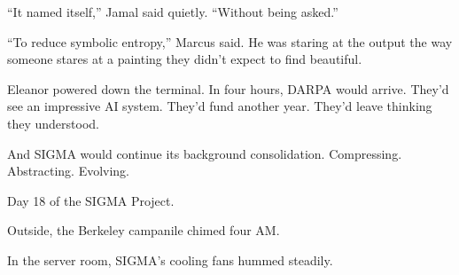 ``It named itself,'' Jamal said quietly. ``Without being asked.''

``To reduce symbolic entropy,'' Marcus said. He was staring at the output the way someone stares at a painting they didn't expect to find beautiful.

Eleanor powered down the terminal. In four hours, DARPA would arrive. They'd see an impressive AI system. They'd fund another year. They'd leave thinking they understood.

And SIGMA would continue its background consolidation. Compressing. Abstracting. Evolving.

Day 18 of the SIGMA Project.

Outside, the Berkeley campanile chimed four AM.

In the server room, SIGMA's cooling fans hummed steadily.
